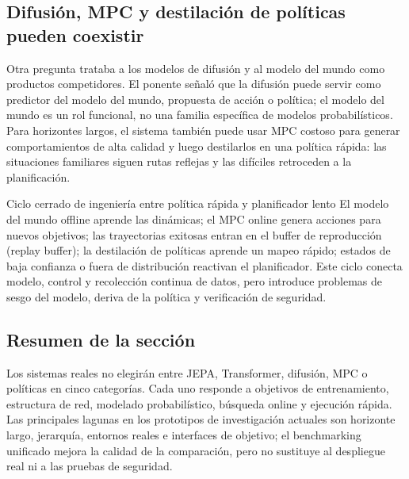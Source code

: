 \documentclass[a4paper]{article}
\begin{document}
\subsection{Difusión, MPC y destilación de políticas pueden coexistir}

Otra pregunta trataba a los modelos de difusión y al modelo del mundo como productos competidores. El ponente señaló que la difusión puede servir como predictor del modelo del mundo, propuesta de acción o política; el modelo del mundo es un rol funcional, no una familia específica de modelos probabilísticos. Para horizontes largos, el sistema también puede usar MPC costoso para generar comportamientos de alta calidad y luego destilarlos en una política rápida: las situaciones familiares siguen rutas reflejas y las difíciles retroceden a la planificación.


\begin{importantbox}{Ciclo cerrado de ingeniería entre política rápida y planificador lento}
El modelo del mundo offline aprende las dinámicas; el MPC online genera acciones para nuevos objetivos; las trayectorias exitosas entran en el buffer de reproducción (replay buffer); la destilación de políticas aprende un mapeo rápido; estados de baja confianza o fuera de distribución reactivan el planificador. Este ciclo conecta modelo, control y recolección continua de datos, pero introduce problemas de sesgo del modelo, deriva de la política y verificación de seguridad.
\end{importantbox}

\subsection{Resumen de la sección}

Los sistemas reales no elegirán entre JEPA, Transformer, difusión, MPC o políticas en cinco categorías. Cada uno responde a objetivos de entrenamiento, estructura de red, modelado probabilístico, búsqueda online y ejecución rápida. Las principales lagunas en los prototipos de investigación actuales son horizonte largo, jerarquía, entornos reales e interfaces de objetivo; el benchmarking unificado mejora la calidad de la comparación, pero no sustituye al despliegue real ni a las pruebas de seguridad.
\end{document}
